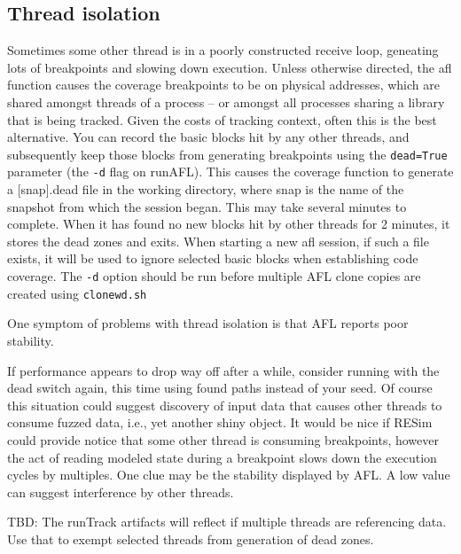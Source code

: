 \documentclass[titlepage]{article}
\begin{document}
\subsection{Thread isolation}
Sometimes some other thread is in a poorly constructed receive loop, geneating lots of breakpoints and slowing down execution.
Unless otherwise directed, the afl function causes the coverage breakpoints to be on physical addresses, which are shared amongst threads of a process -- or amongst
all processes sharing a library that is being tracked.  Given the costs
of tracking context, often this is the best alternative.  You can record the basic blocks hit by any other threads, and subsequently keep those blocks from generating
breakpoints using the {\tt dead=True} parameter (the {\tt -d} flag on runAFL).  This causes the coverage function to generate a [snap].dead file in the working directory, where snap is the
name of the snapshot from which the session began.  This may take several minutes to complete.  When it has found no new blocks hit by other threads for 2 minutes, it stores the
dead zones and exits. When starting a new afl session, if such a file exists, it will be used to ignore selected basic blocks
when establishing code coverage.  The {\tt -d} option should be run before multiple AFL clone copies are created using {\tt clonewd.sh}

One symptom of problems with thread isolation is that AFL reports poor stability.

If performance appears to drop way off after a while, consider running with the dead switch again, this time using found paths instead of your seed.  Of course
this situation could suggest discovery of input data that causes other threads to consume fuzzed data, i.e., yet another shiny object.
It would be nice if RESim could provide notice that some other thread is consuming breakpoints, however the act of reading modeled state during a 
breakpoint slows down the execution cycles by multiples.  One clue may be the stability displayed by AFL.  A low value can suggest interference by other threads.

TBD: The runTrack artifacts will reflect if multiple threads are referencing data. Use that to exempt selected threads from generation of dead zones.
\end{document}
